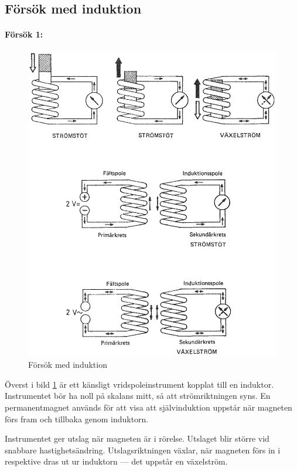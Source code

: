 \subsection{Försök med induktion}

\paragraph{Försök 1:}

\begin{figure}
\includegraphics[width=\textwidth]{images/cropped_pdfs/bild_2_2-03.pdf}
\caption{Försök med induktion}
\label{fig:BildII2-3}
\end{figure}

Överst i bild \ref{fig:BildII2-3} är ett känsligt vridspoleinstrument kopplat
till en induktor. Instrumentet bör ha noll på skalans mitt, så att
strömriktningen syns. En permanentmagnet används för att visa att självinduktion
uppstår när magneten förs fram och tillbaka genom induktorn.

Instrumentet ger utslag när magneten är i rörelse. Utslaget blir större vid
snabbare hastighetsändring. Utslagsriktningen växlar, när magneten förs in i
respektive dras ut ur induktorn --- det uppstår en växelström.

